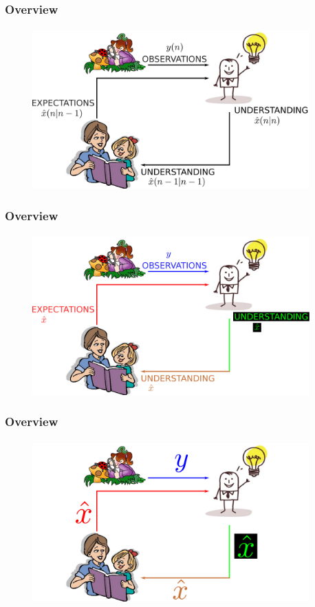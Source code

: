 \begin{frame}\pw\Large
\frametitle{Overview}
\framesubtitle{}
\begin{figure}
\includegraphics[width=0.95\textwidth]{figs/WFAR11_UCP_Update_Prediction_1_Notation-2.pdf}
\end{figure}
\end{frame}



\begin{frame}\pw\Large
\frametitle{Overview}
\framesubtitle{}
\begin{figure}
\includegraphics[width=0.95\textwidth]{figs/WFAR11_UCP_Update_Prediction_1_Notation-3.pdf}
\end{figure}
\end{frame}



\begin{frame}\pw\Large
\frametitle{Overview}
\framesubtitle{}
\begin{figure}
\includegraphics[width=0.95\textwidth]{figs/WFAR11_UCP_Update_Prediction_1_Notation-4.pdf}
\end{figure}
\end{frame}

